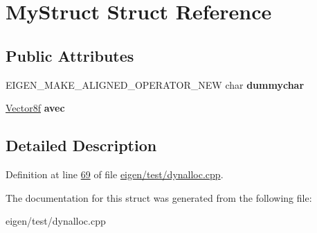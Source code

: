 \hypertarget{struct_my_struct}{}\section{My\+Struct Struct Reference}
\label{struct_my_struct}
\subsection*{Public Attributes}
\begin{DoxyCompactItemize}
\item 
\mbox{\label{struct_my_struct_a2bc4760dee29f487b70fb42717b7837e}} 
E\+I\+G\+E\+N\+\_\+\+M\+A\+K\+E\+\_\+\+A\+L\+I\+G\+N\+E\+D\+\_\+\+O\+P\+E\+R\+A\+T\+O\+R\+\_\+\+N\+EW char {\bfseries dummychar}
\item 
\mbox{\label{struct_my_struct_a8b1111fd8cbebc7fea06c46f01936f3c}} 
\hyperlink{group___core___module}{Vector8f} {\bfseries avec}
\end{DoxyCompactItemize}


\subsection{Detailed Description}


Definition at line \hyperlink{eigen_2test_2dynalloc_8cpp_source_l00069}{69} of file \hyperlink{eigen_2test_2dynalloc_8cpp_source}{eigen/test/dynalloc.\+cpp}.



The documentation for this struct was generated from the following file\+:\begin{DoxyCompactItemize}
\item 
eigen/test/dynalloc.\+cpp\end{DoxyCompactItemize}
